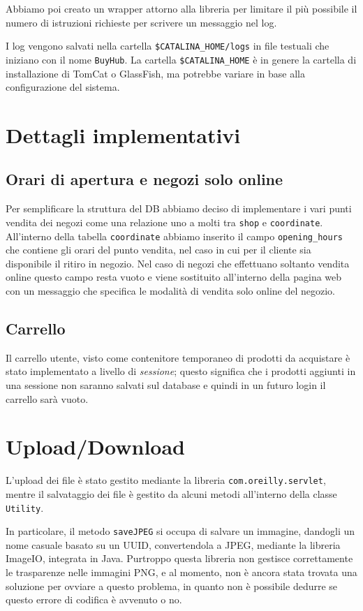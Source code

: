 Abbiamo poi creato un wrapper attorno alla libreria per limitare il più possibile il numero di istruzioni richieste per scrivere un messaggio nel log.

I log vengono salvati nella cartella \texttt{\$CATALINA\_HOME/logs} in file testuali che iniziano con il nome \texttt{BuyHub}.
La cartella \texttt{\$CATALINA\_HOME} è in genere la cartella di installazione di TomCat o GlassFish, ma potrebbe variare in base alla configurazione del sistema.

\chapter{Dettagli implementativi}

\section{Orari di apertura e negozi solo online}
Per semplificare la struttura del DB abbiamo deciso di implementare i vari punti vendita dei negozi come una relazione uno a molti tra \texttt{shop} e \texttt{coordinate}. All'interno della tabella \texttt{coordinate} abbiamo inserito il campo \texttt{opening\_hours} che contiene gli orari del punto vendita, nel caso in cui per il cliente sia disponibile il ritiro in negozio. Nel caso di negozi che effettuano soltanto vendita online questo campo resta vuoto e viene sostituito all'interno della pagina web con un messaggio che specifica le modalità di vendita solo online del negozio.

\section{Carrello}
Il carrello utente, visto come contenitore temporaneo di prodotti da acquistare è stato implementato a livello di \textit{sessione}; questo significa che i prodotti aggiunti in una sessione non saranno salvati sul database e quindi in un futuro login il carrello sarà vuoto.

\chapter{Upload/Download}

L'upload dei file è stato gestito mediante la libreria \texttt{com.oreilly.servlet}, mentre il salvataggio dei file è gestito da alcuni metodi all'interno della classe \texttt{Utility}.

In particolare, il metodo \texttt{saveJPEG} si occupa di salvare un immagine, dandogli un nome casuale basato su un UUID, convertendola a JPEG, mediante la libreria ImageIO, integrata in Java.
Purtroppo questa libreria non gestisce correttamente le trasparenze nelle immagini PNG, e al momento, non è ancora stata trovata una soluzione per ovviare a questo problema, in quanto non è possibile dedurre se questo errore di codifica è avvenuto o no.

